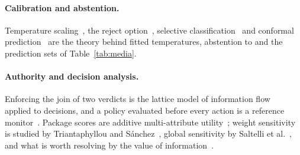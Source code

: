 \paragraph{Calibration and abstention.}
Temperature scaling~\cite{guo2017}, the reject option~\cite{chow1970},
selective classification~\cite{geifman2017} and conformal
prediction~\cite{vovk2005} are the theory behind fitted temperatures,
abstention to \ask{} and the prediction sets of Table~\ref{tab:media}.

\paragraph{Authority and decision analysis.}
Enforcing the join of two verdicts is the lattice model of information
flow~\cite{denning1976} applied to decisions, and a policy evaluated before
every action is a reference monitor~\cite{anderson1972}. Package scores are
additive multi-attribute utility~\cite{keeney1976}; weight sensitivity is
studied by Triantaphyllou and S\'anchez~\cite{triantaphyllou1997}, global
sensitivity by Saltelli et al.~\cite{saltelli2008}, and what is worth
resolving by the value of information~\cite{howard1966}.
